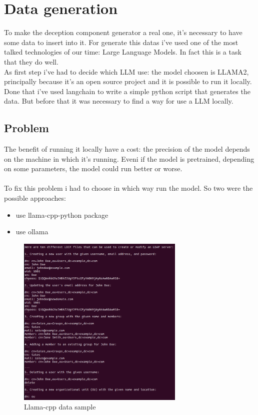 \chapter{Data generation}
To make the deception component generator a real one, it's necessary to have some data to insert into it.
For generate this datas i've used one of the most talked technologies of our time: Large Language Models. In fact this is a task that they do well.
\\
As first step i've had to decide which LLM use: the model choosen is LLAMA2, principally because it's an open source project and it is possible to run it locally.
Done that i've used langchain \cite{langchain} to write a simple python script that generates the data. But before that it was necessary to find a way for use a LLM locally.
\section{Problem}
The benefit of running it locally have a cost: the precision of the model depends on the machine in which it's running. Eveni if the model is pretrained, depending on some parameters, the model could run better or worse.
\\\\
To fix this problem i had to choose in which way run the model. So two were the possible approaches:
\begin{itemize}
    \item use llama-cpp-python package
    \item use ollama
\end{itemize}
\begin{figure}[h]
    \caption{Llama-cpp data sample}
    \centering
    \includegraphics[width=8cm]{img/llamacpp.png}
\end{figure}
